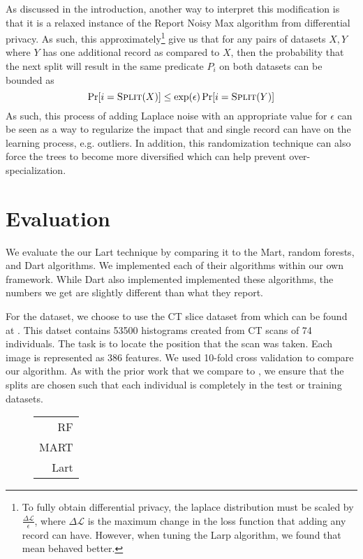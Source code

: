 \documentclass{article} %
\begin{document}
As discussed in the introduction, another way to interpret this modification is that it is a relaxed instance of the Report Noisy Max\cite{privacyBook} algorithm from differential privacy. As such, this approximately\footnote{To fully obtain differential privacy, the laplace distribution must be scaled by $\frac{ \Delta\mathcal{L}}{\epsilon}$, where $\Delta\mathcal{L}$ is the maximum change in the loss function that adding any record can have. However, when tuning the Larp algorithm, we found that mean behaved better.} give us that for any pairs of datasets $X,Y$ where $Y$ has one additional record as compared to $X$, then the probability that the next split will result in the same predicate $P_i$ on both datasets can be bounded as
$$
	\Pr[i = \textsc{Split}(X)] \leq \exp(\epsilon)\Pr[i =\textsc{Split}(Y)]
$$
As such, this process of adding Laplace noise with an appropriate value for $\epsilon$ can be seen as a way to regularize the impact that and single record can have on the learning process, e.g. outliers. In addition, this randomization technique can also force the trees to become more diversified which can help prevent over-specialization.

\section{Evaluation}

We evaluate the our Lart technique by comparing it to the Mart, random forests, and Dart\cite{dart} algorithms. We implemented each of their algorithms within our own framework. While Dart\cite{dart} also implemented implemented these algorithms, the numbers we get are slightly different than what they report. 

For the dataset, we choose to use the CT slice dataset from \cite{graf20112d} which can be found at \cite{uci_ctSlice}. This datset contains 53500 histograms created from CT scans of 74 individuals. The task is to locate the position that the scan was taken. Each image is represented as 386 features. We used 10-fold cross validation to compare our algorithm. As with the prior work that we compare to \cite{dart}, we ensure that the splits are chosen such that each individual is completely in the test or training datasets.


\begin{figure}	\centering
	\begin{tabular}{|r|}
 \hline
 
 \hline
               RF \\
               MART \\
               Lart \\\hline
	\end{tabular} 	
	\caption{ }
\end{figure}
\end{document}
